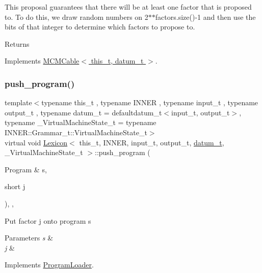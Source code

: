 This proposal guarantees that there will be at least one factor that is proposed to. To do this, we draw random numbers on 2$\ast$$\ast$factors.size()-\/1 and then use the bits of that integer to determine which factors to propose to. \begin{DoxyReturn}{Returns}

\end{DoxyReturn}


Implements \hyperlink{class_m_c_m_cable_a98b52f1867ea0d72c1c91b4496d756d2}{M\+C\+M\+Cable$<$ this\+\_\+t, datum\+\_\+t $>$}.

\mbox{\label{class_lexicon_a16462025a8be6ffff655b27c84b4307d}} 
\subsubsection{\texorpdfstring{push\+\_\+program()}{push\_program()}}
{\footnotesize\ttfamily template$<$typename this\+\_\+t , typename I\+N\+N\+ER , typename input\+\_\+t , typename output\+\_\+t , typename datum\+\_\+t  = defaultdatum\+\_\+t$<$input\+\_\+t, output\+\_\+t$>$, typename \+\_\+\+Virtual\+Machine\+State\+\_\+t  = typename I\+N\+N\+E\+R\+::\+Grammar\+\_\+t\+::\+Virtual\+Machine\+State\+\_\+t$>$ \\
virtual void \hyperlink{class_lexicon}{Lexicon}$<$ this\+\_\+t, I\+N\+N\+ER, input\+\_\+t, output\+\_\+t, \hyperlink{class_bayesable_a9f1a6c0cd7855550fa10b1a8f13a5867}{datum\+\_\+t}, \+\_\+\+Virtual\+Machine\+State\+\_\+t $>$\+::push\+\_\+program (\begin{DoxyParamCaption}\item[{Program \&}]{s,  }\item[{short}]{j }\end{DoxyParamCaption})\hspace{0.3cm}{\ttfamily [inline]}, {\ttfamily [override]}, {\ttfamily [virtual]}}

Put factor j onto program s 
\begin{DoxyParams}{Parameters}
{\em s} & \\
\hline
{\em j} & \\
\hline
\end{DoxyParams}


Implements \hyperlink{class_program_loader_a68b234befb88579aaeeeed52414f9bd1}{Program\+Loader}.

\mbox{\label{class_lexicon_af78f84c26c2b3593c505388a45ba6d19}} 
